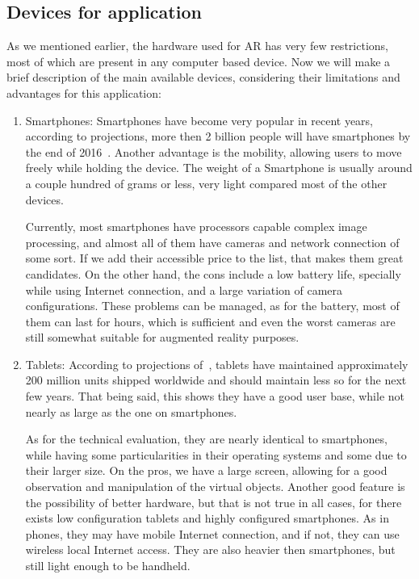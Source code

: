 \documentclass[a4paper,twoside]{article}
\begin{document}
\subsection{Devices for application}
As we mentioned earlier, the hardware used for AR has very few restrictions, most of which are present in any computer based device. Now we will make a brief description of the main available devices, considering their limitations and advantages for this application:
\begin{enumerate}
\item Smartphones: Smartphones have become very popular in recent years, according to projections, more then 2 billion people will have smartphones by the end of 2016~\cite{2Billion75}. Another advantage is the mobility, allowing users to move freely while holding the device. The weight of a Smartphone is usually around a couple hundred of grams or less, very light compared most of the other devices.

Currently, most smartphones have processors capable complex image processing, and almost all of them have cameras and network connection of some sort. If we add their accessible price to the list, that makes them great candidates. On the other hand, the cons include a low battery life, specially while using Internet connection, and a large variation of camera configurations. These problems can be managed, as for the battery, most of them can last for hours, which is sufficient and even the worst cameras are still somewhat suitable for augmented reality purposes.

\item Tablets: According to projections of~\cite{Globalt81}, tablets have maintained approximately 200 million units shipped worldwide and should maintain less so for the next few years. That being said, this shows they have a good user base, while not nearly as large as the one on smartphones. 

As for the technical evaluation, they are nearly identical to smartphones, while having some particularities in their operating systems and some due to their larger size. On the pros, we have a large screen, allowing for a good observation and manipulation of the virtual objects. Another good feature is the possibility of better hardware, but that is not true in all cases, for there exists low configuration tablets and highly configured smartphones. As in phones, they may have mobile Internet connection, and if not, they can use wireless local Internet access. They are also heavier then smartphones, but still light enough to be handheld.


\end{enumerate}
\end{document}

